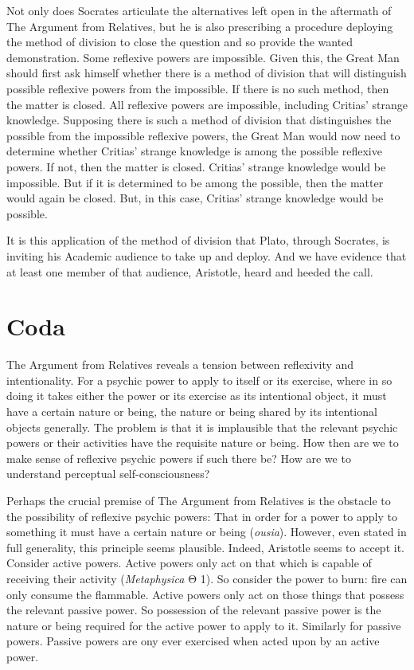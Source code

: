 Not only does Socrates articulate the alternatives left open in the aftermath of The Argument from Relatives, but he is also prescribing a procedure deploying the method of division to close the question and so provide the wanted demonstration. Some reflexive powers are impossible. Given this, the Great Man should first ask himself whether there is a method of division that will distinguish possible reflexive powers from the impossible. If there is no such method, then the matter is closed. All reflexive powers are impossible, including Critias' strange knowledge. Supposing there is such a method of division that distinguishes the possible from the impossible reflexive powers, the Great Man would now need to determine whether Critias' strange knowledge is among the possible reflexive powers. If not, then the matter is closed. Critias' strange knowledge would be impossible. But if it is determined to be among the possible, then the matter would again be closed. But, in this case, Critias' strange knowledge would be possible.

It is this application of the method of division that Plato, through Socrates, is inviting his Academic audience to take up and deploy. And we have evidence that at least one member of that audience, Aristotle, heard and heeded the call.


\section{Coda} %
\label{sec:coda}

The Argument from Relatives reveals a tension between reflexivity and intentionality. For a psychic power to apply to itself or its exercise, where in so doing it takes either the power or its exercise as its intentional object, it must have a certain nature or being, the nature or being shared by its intentional objects generally. The problem is that it is implausible that the relevant psychic powers or their activities have the requisite nature or being. How then are we to make sense of reflexive psychic powers if such there be? How are we to understand perceptual self-consciousness?

Perhaps the crucial premise of The Argument from Relatives is the obstacle to the possibility of reflexive psychic powers: That in order for a power to apply to something it must have a certain nature or being (\emph{ousia}). However, even stated in full generality, this principle seems plausible. Indeed, Aristotle seems to accept it. Consider active powers. Active powers only act on that which is capable of receiving their activity (\emph{Metaphysica} {\sbl Θ} 1). So consider the power to burn: fire can only consume the flammable. Active powers only act on those things that possess the relevant passive power. So possession of the relevant passive power is the nature or being required for the active power to apply to it. Similarly for passive powers. Passive powers are ony ever exercised when acted upon by an active power.

